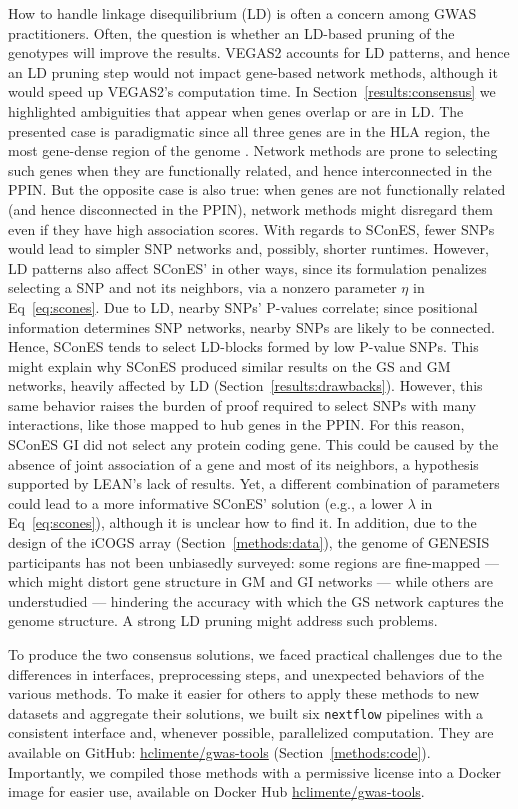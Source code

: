 \documentclass[10pt,letterpaper]{article}
\begin{document}
How to handle linkage disequilibrium (LD) is often a concern among GWAS practitioners. Often, the question is whether an LD-based pruning of the genotypes will improve the results. VEGAS2 accounts for LD patterns, and hence an LD pruning step would not impact gene-based network methods, although it would speed up VEGAS2's computation time. In Section~\ref{results:consensus} we highlighted ambiguities that appear when genes overlap or are in LD. The presented case is paradigmatic since all three genes are in the HLA region, the most gene-dense region of the genome \cite{Xie2003}. Network methods are prone to selecting such genes when they are functionally related, and hence interconnected in the PPIN. But the opposite case is also true: when genes are not functionally related (and hence disconnected in the PPIN), network methods might disregard them even if they have high association scores. With regards to SConES, fewer SNPs would lead to simpler SNP networks and, possibly, shorter runtimes. However, LD patterns also affect SConES' in other ways, since its formulation penalizes selecting a SNP and not its neighbors, via a nonzero parameter $\eta$ in Eq~\ref{eq:scones}. Due to LD, nearby SNPs' P-values correlate; since positional information determines SNP networks, nearby SNPs are likely to be connected. Hence, SConES tends to select LD-blocks formed by low P-value SNPs. This might explain why SConES produced similar results on the GS and GM networks, heavily affected by LD (Section~\ref{results:drawbacks}). However, this same behavior raises the burden of proof required to select SNPs with many interactions, like those mapped to hub genes in the PPIN. For this reason, SConES GI did not select any protein coding gene. This could be caused by the absence of joint association of a gene and most of its neighbors, a hypothesis supported by LEAN's lack of results. Yet, a different combination of parameters could lead to a more informative SConES' solution (e.g., a lower \(\lambda\) in Eq~\ref{eq:scones}), although it is unclear how to find it. In addition, due to the design of the iCOGS array (Section~\ref{methods:data}), the genome of GENESIS participants has not been unbiasedly surveyed: some regions are fine-mapped --- which might distort gene structure in GM and GI networks --- while others are understudied --- hindering the accuracy with which the GS network captures the genome structure. A strong LD pruning might address such problems. 

To produce the two consensus solutions, we faced practical challenges due to the differences in interfaces, preprocessing steps, and unexpected behaviors of the various methods. To make it easier for others to apply these methods to new datasets and aggregate their solutions, we built six \texttt{nextflow} pipelines \cite{di_tommaso_nextflow_2017} with a consistent interface and, whenever possible, parallelized computation. They are available on GitHub: \href{https://github.com/hclimente/gwas-tools}{hclimente/gwas-tools} (Section~\ref{methods:code}). Importantly, we compiled those methods with a permissive license into a Docker image for easier use, available on Docker Hub \href{https://hub.docker.com/r/hclimente/gwas-tools}{hclimente/gwas-tools}.
\end{document}
